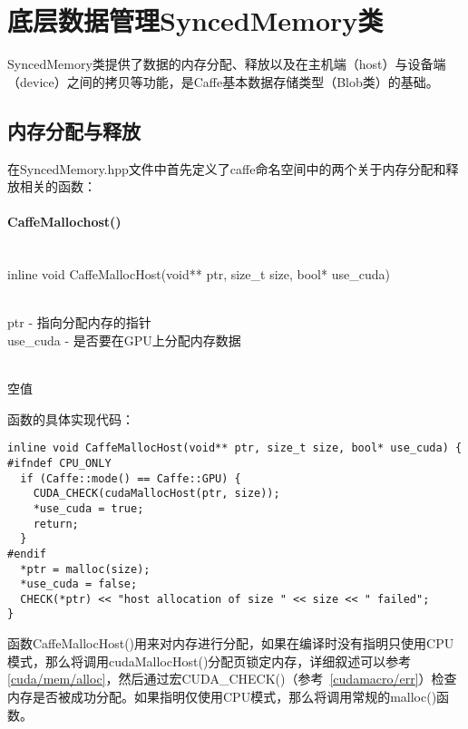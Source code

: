 \chapter{底层数据管理SyncedMemory类}
SyncedMemory类提供了数据的内存分配、释放以及在主机端（host）与设备端（device）之间的拷贝等功能，是Caffe基本数据存储类型（Blob类）的基础。
\section{内存分配与释放}
在SyncedMemory.hpp文件中首先定义了caffe命名空间中的两个关于内存分配和释放相关的函数：
\subsubsection{CaffeMallochost()}
\begin{cnfrmfunc}
   \item{}\\
     inline void CaffeMallocHost(void** ptr, size\_t size, bool* use\_cuda)
   \item{}\\
     ptr - 指向分配内存的指针\\
     use\_cuda - 是否要在GPU上分配内存数据
   \item{}\\
     空值
   \end{cnfrmfunc}
函数的具体实现代码：
\begin{verbatim}
inline void CaffeMallocHost(void** ptr, size_t size, bool* use_cuda) {
#ifndef CPU_ONLY
  if (Caffe::mode() == Caffe::GPU) {
    CUDA_CHECK(cudaMallocHost(ptr, size));
    *use_cuda = true;
    return;
  }
#endif
  *ptr = malloc(size);
  *use_cuda = false;
  CHECK(*ptr) << "host allocation of size " << size << " failed";
}
\end{verbatim}
函数CaffeMallocHost()用来对内存进行分配，如果在编译时没有指明只使用CPU模式，那么将调用cudaMallocHost()分配页锁定内存，详细叙述可以参考\ref{cuda/mem/alloc}，然后通过宏CUDA\_CHECK()（参考~\ref{cudamacro/err}）检查内存是否被成功分配。如果指明仅使用CPU模式，那么将调用常规的malloc()函数。
